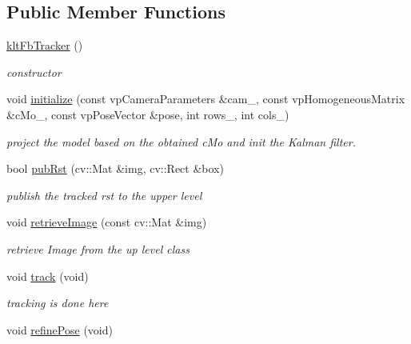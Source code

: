 \subsection*{\-Public \-Member \-Functions}
\begin{DoxyCompactItemize}
\item 
\hypertarget{classkltFbTracker_ad1cb6684fe1235e576acdda1f7595d63}{\hyperlink{classkltFbTracker_ad1cb6684fe1235e576acdda1f7595d63}{klt\-Fb\-Tracker} ()}\label{classkltFbTracker_ad1cb6684fe1235e576acdda1f7595d63}

\begin{DoxyCompactList}\small\item\em constructor \end{DoxyCompactList}\item 
void \hyperlink{classkltFbTracker_a9e81cb441cb49cdd064343cc19d7f002}{initialize} (const vp\-Camera\-Parameters \&cam\-\_\-, const vp\-Homogeneous\-Matrix \&c\-Mo\-\_\-, const vp\-Pose\-Vector \&pose, int rows\-\_\-, int cols\-\_\-)
\begin{DoxyCompactList}\small\item\em project the model based on the obtained c\-Mo and init the \-Kalman filter. \end{DoxyCompactList}\item 
bool \hyperlink{classkltFbTracker_a0873200aa663a771410ed98c86c0f82b}{pub\-Rst} (cv\-::\-Mat \&img, cv\-::\-Rect \&box)
\begin{DoxyCompactList}\small\item\em publish the tracked rst to the upper level \end{DoxyCompactList}\item 
void \hyperlink{classkltFbTracker_a4bcd62be59529e0bafd606f8bff6c414}{retrieve\-Image} (const cv\-::\-Mat \&img)
\begin{DoxyCompactList}\small\item\em retrieve \-Image from the up level class \end{DoxyCompactList}\item 
\hypertarget{classkltFbTracker_addf646a894f55485b2675009d95c1829}{void \hyperlink{classkltFbTracker_addf646a894f55485b2675009d95c1829}{track} (void)}\label{classkltFbTracker_addf646a894f55485b2675009d95c1829}

\begin{DoxyCompactList}\small\item\em tracking is done here \end{DoxyCompactList}\item 
\hypertarget{classkltFbTracker_a3257d85e4d7c1b3e29d765551fbe7507}{void \hyperlink{classkltFbTracker_a3257d85e4d7c1b3e29d765551fbe7507}{refine\-Pose} (void)}\label{classkltFbTracker_a3257d85e4d7c1b3e29d765551fbe7507}


\end{DoxyCompactItemize}
